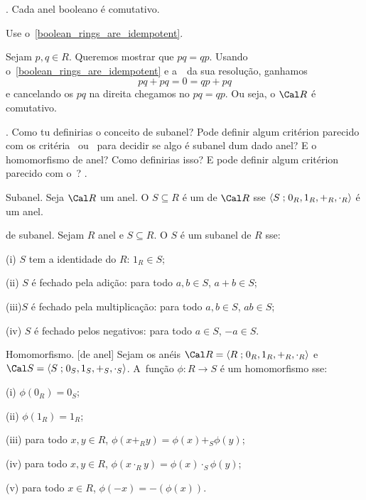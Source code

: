 \endexercise

\exercise.
\label{boolean_rings_are_commutative}%
Cada anel booleano é comutativo.

\hint
Use o~\ref{boolean_rings_are_idempotent}.

\solution
Sejam $p,q \in R$.
Queremos mostrar que $pq = qp$.
Usando o~\ref{boolean_rings_are_idempotent} e
a~~da sua resolução,
ganhamos
$$
pq + pq = 0 = qp + pq
$$
e cancelando os $pq$ na direita chegamos no $pq = qp$.
Ou seja, o $\cal R$ é comutativo.

\endexercise

\question.
Como tu definirias o conceito de subanel?
Pode definir algum critérion parecido com os critéria~
ou~ para decidir se algo é subanel dum dado anel?
E o homomorfismo de anel?  Como definirias isso?  E pode definir algum critérion
parecido com o~?
\spoiler.

 Subanel.
\label{subring}%
%
Seja $\cal R$ um anel.
O $S\subseteq R$ é um  de $\cal R$ sse
$\langle{S}\mathrel{;}{0_R, 1_R, +_R, \cdot_R}\rangle$ é um anel.

\criterion de subanel.
\label{subring_criterion}%
Sejam $R$ anel e $S \subseteq R$.
O $S$ é um subanel de $R$ sse:
\item{\rm (i)}  $S$ tem a identidade do $R$: $1_R \in S$;
\item{\rm (ii)} $S$ é fechado pela adição: para todo $a,b \in S$, $a+b \in S$;
\item{\rm (iii)}$S$ é fechado pela multiplicação: para todo $a,b \in S$, $ab \in S$;
\item{\rm (iv)} $S$ é fechado pelos negativos: para todo $a \in S$, $-a\in S$.

 Homomorfismo.
\label{ring_homomorphism}%
[de anel]%
Sejam os anéis
$\cal R = \sset R {0_R, 1_R, +_R, \cdot_R}$ e
$\cal S = \sset S {0_S, 1_S, +_S, \cdot_S}$.
A~função $\phi : R \to S$ é um homomorfismo sse:
\item{\rm (i)}   $\phi(0_R) = 0_S$;
\item{\rm (ii)}  $\phi(1_R) = 1_R$;
\item{\rm (iii)} para todo $x,y\in R$, $\phi(x+_R y) = \phi(x) +_S \phi(y)$;
\item{\rm (iv)}  para todo $x,y\in R$, $\phi(x\cdot_R y) = \phi(x) \cdot_S \phi(y)$;
\item{\rm (v)}   para todo $x\in R$, $\phi(-x) = -(\phi(x))$.

